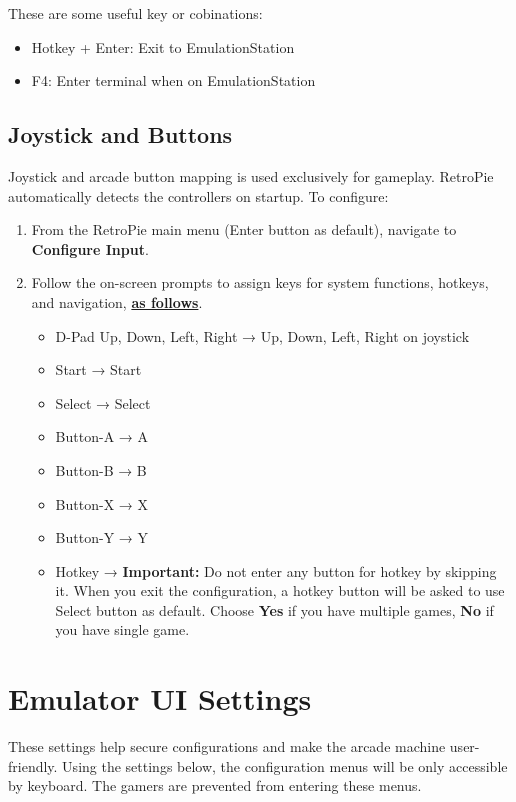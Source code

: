 These are some useful key or cobinations:
\begin{itemize}
  \item Hotkey + Enter: Exit to EmulationStation
  \item F4: Enter terminal when on EmulationStation
\end{itemize}

\subsection{Joystick and Buttons}
\label{subsec:joystick_buttons}

Joystick and arcade button mapping is used exclusively for gameplay. RetroPie automatically detects the controllers on startup. To configure:

\begin{enumerate}
  \item From the RetroPie main menu (Enter button as default), navigate to \textbf{Configure Input}.
  \item Follow the on-screen prompts to assign keys for system functions, hotkeys, and navigation, \textbf{\underline{as follows}}.
    \begin{itemize}
      \item D-Pad Up, Down, Left, Right → Up, Down, Left, Right on joystick
      \item Start → Start
      \item Select → Select
      \item Button-A → A
      \item Button-B → B
      \item Button-X → X
      \item Button-Y → Y
      \item Hotkey → \textbf{Important:} Do not enter any button for hotkey by skipping it. When you exit the configuration, a hotkey button will be asked to use Select button as default. Choose \textbf{Yes} if you have multiple games, \textbf{No} if you have single game.
    \end{itemize}
\end{enumerate}

\section{Emulator UI Settings}
\label{sec:emulator_settings}

These settings help secure configurations and make the arcade machine user-friendly. Using the settings below, the configuration menus will be only accessible by keyboard. The gamers are prevented from entering these menus.

